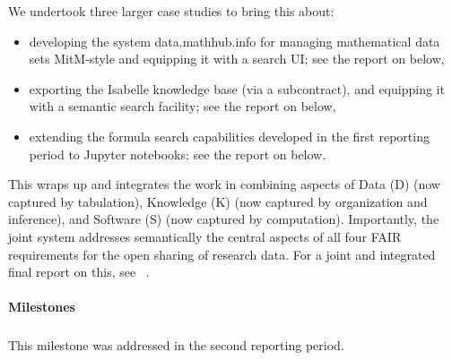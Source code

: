 We undertook three larger case studies to bring this about:
\begin{itemize}
\item developing the system data.mathhub.info for managing mathematical data sets MitM-style and equipping it with a search UI; see the report on  below,
\item exporting the Isabelle knowledge base (via a subcontract), and equipping it with a semantic search facility; see the report on  below,
\item extending the formula search capabilities developed in the first reporting period to Jupyter notebooks; see the report on
  below.
\end{itemize}
This wraps up and integrates the work in  combining aspects of Data (D) (now captured by tabulation), Knowledge (K) (now captured by organization and inference), and Software (S) (now captured by computation).
Importantly, the joint system addresses semantically the central aspects of all four FAIR requirements for the open sharing of research data. 
For a joint and integrated final report on this, see ~\cite{ODK-D6.10}.


\paragraph{Milestones}

\subparagraph{}
This milestone was addressed in the second reporting period.
\medskip
%

